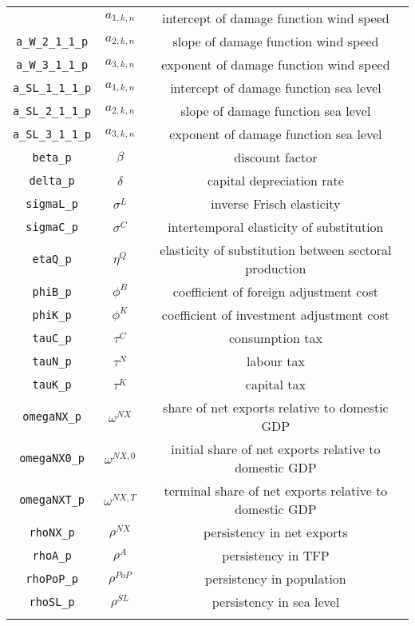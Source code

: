 \begin{center}
\begin{longtable}{ccc}
{\texttt{a\_W\_1\_1\_1\_p} & ${a_{1,k,n}}$ & intercept of damage function wind speed\\
\texttt{a\_W\_2\_1\_1\_p} & ${a_{2,k,n}}$ & slope of damage function wind speed\\
\texttt{a\_W\_3\_1\_1\_p} & ${a_{3,k,n}}$ & exponent of damage function wind speed\\
\texttt{a\_SL\_1\_1\_1\_p} & ${a_{1,k,n}}$ & intercept of damage function sea level\\
\texttt{a\_SL\_2\_1\_1\_p} & ${a_{2,k,n}}$ & slope of damage function sea level\\
\texttt{a\_SL\_3\_1\_1\_p} & ${a_{3,k,n}}$ & exponent of damage function sea level\\
\texttt{beta\_p} & ${\beta}$ & discount factor\\
\texttt{delta\_p} & ${\delta}$ & capital depreciation rate\\
\texttt{sigmaL\_p} & ${\sigma^{L}}$ & inverse Frisch elasticity\\
\texttt{sigmaC\_p} & ${\sigma^{C}}$ & intertemporal elasticity of substitution\\
\texttt{etaQ\_p} & ${\eta^{Q}}$ & elasticity of substitution between sectoral production\\
\texttt{phiB\_p} & ${\phi^{B}}$ & coefficient of foreign adjustment cost\\
\texttt{phiK\_p} & ${\phi^{K}}$ & coefficient of investment adjustment cost\\
\texttt{tauC\_p} & ${\tau^{C}}$ & consumption tax\\
\texttt{tauN\_p} & ${\tau^{N}}$ & labour tax\\
\texttt{tauK\_p} & ${\tau^{K}}$ & capital tax\\
\texttt{omegaNX\_p} & ${\omega^{NX}}$ & share of net exports relative to domestic GDP\\
\texttt{omegaNX0\_p} & ${\omega^{NX,0}}$ & initial share of net exports relative to domestic GDP\\
\texttt{omegaNXT\_p} & ${\omega^{NX,T}}$ & terminal share of net exports relative to domestic GDP\\
\texttt{rhoNX\_p} & ${\rho^{NX}}$ & persistency in net exports\\
\texttt{rhoA\_p} & ${\rho^{A}}$ & persistency in TFP\\
\texttt{rhoPoP\_p} & ${\rho^{PoP}}$ & persistency in population\\
\texttt{rhoSL\_p} & ${\rho^{SL}}$ & persistency in sea level\\
}
\end{longtable}
\end{center}
